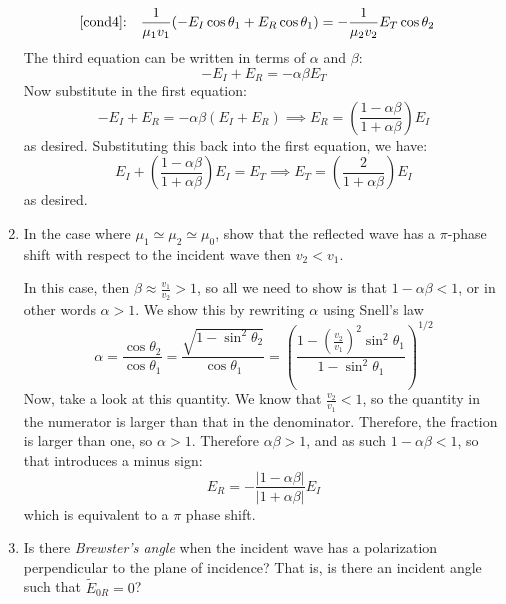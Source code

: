 \documentclass[10pt]{article}
\begin{document}
\begin{enumerate}[label=(\alph*)]
\begin{solution}
\begin{align*}
					\text{\ref{cond4}:}& \quad \frac{1}{\mu_1v_1}(-E_I \cos \theta_1 + E_R \cos \theta_1) =
					-\frac{1}{\mu_2v_2}E_T \cos \theta_2
				\end{align*}
				The third equation can be written in terms of \( \alpha \) and \( \beta \):
				\[
					-E_I + E_R = - \alpha \beta E_T
				\]
				Now substitute in the first equation:
				\[
					-E_I + E_R = - \alpha \beta (E_I + E_R) \implies E_R = \left( \frac{1-\alpha \beta}{1 +
					\alpha \beta} \right)E_I
				\]
				as desired. Substituting this back into the first equation, we have:
				\[
					E_I + \left( \frac{1 - \alpha \beta}{1 + \alpha \beta} \right)E_I = E_T \implies E_T =
					\left(\frac{2}{1 + \alpha \beta}\right) E_I
				\]
				as desired. 
			\end{solution}
		\item In the case where \( \mu_1 \simeq \mu_2 \simeq \mu_0 \), show that the reflected wave has a \(
			\pi\)-phase shift with respect to the incident wave then \( v_2 < v_1 \). 

			\begin{solution}
				In this case, then \( \beta \approx \frac{v_1}{v_2} > 1 \), so all we need to show is that \(
				1 - \alpha \beta < 1\), or in other words \( \alpha > 1 \). We show this by rewriting \( \alpha
				\) using Snell's law
				\[
					\alpha = \frac{\cos \theta_2}{\cos \theta_1} = \frac{\sqrt{1 - \sin^2 \theta_2}}{\cos
					\theta_1} = \left( \frac{1 - \left( \frac{v_2}{v_1} \right)^2 \sin^2 \theta_1}{1 - \sin^2
					\theta_1} \right)^{1 / 2}
				\]
				Now, take a look at this quantity. We know that \( \frac{v_2}{v_1} < 1 \), so the quantity in
				the numerator is larger than that in the denominator. Therefore, the fraction is larger than
				one, so \( \alpha > 1 \). Therefore \( \alpha \beta > 1 \), and as such \( 1 - \alpha \beta <
				1 \), so that introduces a minus sign:
				\[
					E_R = - \frac{|1 - \alpha \beta|}{|1 + \alpha \beta|}E_I 
				\]
				which is equivalent to a \( \pi \) phase shift. 
			\end{solution}
		\item Is there \textit{Brewster's angle} when the incident wave has a polarization perpendicular to
			the plane of incidence? That is, is there an incident angle such that \( \tilde E_{0R} = 0 \)?  


\end{enumerate}
\end{document}
